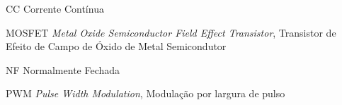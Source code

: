 \begin{siglas} %
    \item[CC] Corrente Contínua
    \item[MOSFET] \textit{Metal Oxide Semiconductor Field Effect Transistor}, Transistor de Efeito de Campo de Óxido de Metal Semicondutor
    \item[NF] Normalmente Fechada 
    \item[PWM] \textit{Pulse Width Modulation}, Modulação por largura de pulso
\end{siglas}
